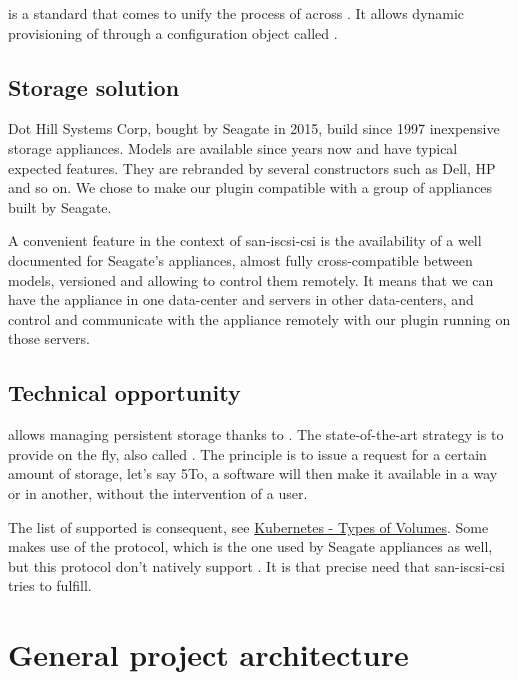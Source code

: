 is a standard that comes to unify the process of  across . It allows dynamic provisioning of  through a configuration object called .

\subsection{Storage solution}

Dot Hill Systems Corp, bought by Seagate in 2015, build since 1997 inexpensive storage appliances. Models are available since years now and have typical expected features. They are rebranded by several constructors such as Dell, HP and so on. We chose to make our  plugin compatible with a group of appliances built by Seagate.

A convenient feature in the context of \gls{san-iscsi-csi} is the availability of a well documented  for Seagate's appliances, almost fully cross-compatible between models, versioned and allowing to control them remotely. It means that we can have the appliance in one data-center and servers in other data-centers, and control and communicate with the appliance remotely with our plugin running on those servers.

\subsection{Technical opportunity}

 allows managing  persistent storage thanks to . The state-of-the-art strategy is to provide  on the fly, also called . The principle is to issue a request for a certain amount of storage, let's say 5To, a software will then make it available in a way or in another, without the intervention of a user.

The list of supported  is consequent, see \href{https://kubernetes.io/docs/concepts/storage/volumes/\#types-of-volumes}{Kubernetes - Types of Volumes}. Some  makes use of the  protocol, which is the one used by Seagate appliances as well, but this protocol don't natively support . It is that precise need that \gls{san-iscsi-csi} tries to fulfill.

\section{General project architecture}

